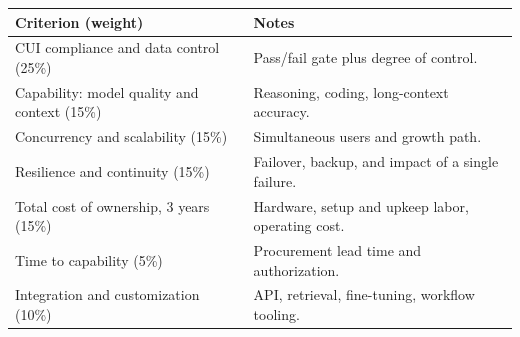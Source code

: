 
{\small
\begin{tabularx}{\textwidth}{@{}Y{0.667}Y{1.333}@{}}
  \toprule
  Criterion (weight) & Notes \\
  \midrule
  CUI compliance and data control (25\%) & Pass/fail gate plus degree of control. \\
  Capability: model quality and context (15\%) & Reasoning, coding, long-context accuracy. \\
  Concurrency and scalability (15\%) & Simultaneous users and growth path. \\
  Resilience and continuity (15\%) & Failover, backup, and impact of a single failure. \\
  Total cost of ownership, 3 years (15\%) & Hardware, setup and upkeep labor, operating cost. \\
  Time to capability (5\%) & Procurement lead time and authorization. \\
  Integration and customization (10\%) & API, retrieval, fine-tuning, workflow tooling. \\
  \bottomrule
\end{tabularx}}
